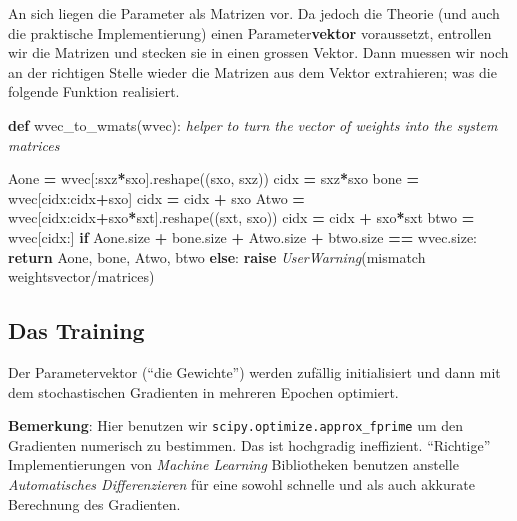 \documentclass[
]{book}
\newenvironment{Shaded}{\begin{snugshade}}{\end{snugshade}}
\newcommand{\CommentTok}[1]{\textcolor[rgb]{0.56,0.35,0.01}{\textit{#1}}}
\newcommand{\ControlFlowTok}[1]{\textcolor[rgb]{0.13,0.29,0.53}{\textbf{#1}}}
\newcommand{\KeywordTok}[1]{\textcolor[rgb]{0.13,0.29,0.53}{\textbf{#1}}}
\newcommand{\NormalTok}[1]{#1}
\newcommand{\OperatorTok}[1]{\textcolor[rgb]{0.81,0.36,0.00}{\textbf{#1}}}
\newcommand{\PreprocessorTok}[1]{\textcolor[rgb]{0.56,0.35,0.01}{\textit{#1}}}
\newcommand{\StringTok}[1]{\textcolor[rgb]{0.31,0.60,0.02}{#1}}
\theoremstyle{definition}
\theoremstyle{definition}
\theoremstyle{definition}
\theoremstyle{definition}
\theoremstyle{remark}
\begin{document}
An sich liegen die Parameter als Matrizen vor. Da jedoch die Theorie (und auch die praktische Implementierung) einen Parameter\textbf{vektor} voraussetzt, entrollen wir die Matrizen und stecken sie in einen grossen Vektor. Dann muessen wir noch an der richtigen Stelle wieder die Matrizen aus dem Vektor extrahieren; was die folgende Funktion realisiert.

\begin{Shaded}
\begin{Highlighting}[]
\KeywordTok{def}\NormalTok{ wvec\_to\_wmats(wvec):}
    \CommentTok{\textquotesingle{}\textquotesingle{}\textquotesingle{} helper to turn the vector of weights into the system matrices}

\CommentTok{    \textquotesingle{}\textquotesingle{}\textquotesingle{}}
\NormalTok{    Aone }\OperatorTok{=}\NormalTok{ wvec[:sxz}\OperatorTok{*}\NormalTok{sxo].reshape((sxo, sxz))}
\NormalTok{    cidx }\OperatorTok{=}\NormalTok{ sxz}\OperatorTok{*}\NormalTok{sxo}
\NormalTok{    bone }\OperatorTok{=}\NormalTok{ wvec[cidx:cidx}\OperatorTok{+}\NormalTok{sxo]}
\NormalTok{    cidx }\OperatorTok{=}\NormalTok{ cidx }\OperatorTok{+}\NormalTok{ sxo}
\NormalTok{    Atwo }\OperatorTok{=}\NormalTok{ wvec[cidx:cidx}\OperatorTok{+}\NormalTok{sxo}\OperatorTok{*}\NormalTok{sxt].reshape((sxt, sxo))}
\NormalTok{    cidx }\OperatorTok{=}\NormalTok{ cidx }\OperatorTok{+}\NormalTok{ sxo}\OperatorTok{*}\NormalTok{sxt}
\NormalTok{    btwo }\OperatorTok{=}\NormalTok{ wvec[cidx:]}
    \ControlFlowTok{if}\NormalTok{ Aone.size }\OperatorTok{+}\NormalTok{ bone.size }\OperatorTok{+}\NormalTok{ Atwo.size }\OperatorTok{+}\NormalTok{ btwo.size }\OperatorTok{==}\NormalTok{ wvec.size:}
        \ControlFlowTok{return}\NormalTok{ Aone, bone, Atwo, btwo}
    \ControlFlowTok{else}\NormalTok{:}
        \ControlFlowTok{raise} \PreprocessorTok{UserWarning}\NormalTok{(}\StringTok{\textquotesingle{}mismatch weightsvector/matrices\textquotesingle{}}\NormalTok{)}
\end{Highlighting}
\end{Shaded}

\hypertarget{das-training}{%
\subsection{Das Training}\label{das-training}}

Der Parametervektor (``die Gewichte'') werden zufällig initialisiert und dann mit dem stochastischen Gradienten in mehreren Epochen optimiert.

\textbf{Bemerkung}: Hier benutzen wir \texttt{scipy.optimize.approx\_fprime} um den
Gradienten numerisch zu bestimmen. Das ist hochgradig ineffizient. ``Richtige''
Implementierungen von \emph{Machine Learning} Bibliotheken benutzen anstelle
\emph{Automatisches Differenzieren} für eine sowohl schnelle und als auch akkurate Berechnung des Gradienten.
\end{document}
